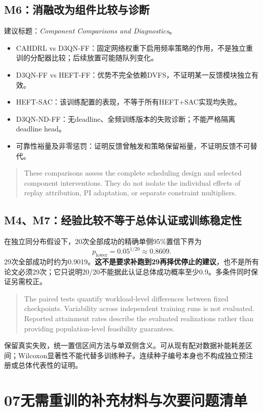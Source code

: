 \documentclass[UTF8,11pt,a4paper,fontset=fandol]{ctexart}
\newenvironment{draft}{\begin{quote}\small\setlength{\parskip}{4pt}}{\end{quote}}
\newcommand{\partpage}[2]{\section*{#1\quad #2}}
\begin{document}
\subsection*{M6：消融改为组件比较与诊断}
建议标题：\textit{Component Comparisons and Diagnostics}。
\begin{itemize}
\item CAHDRL vs D3QN-FF：固定网络权重下启用频率策略的作用，不是独立重训的分配器比较；后续放置可能随队列变化。
\item D3QN-FF vs HEFT-FF：优势不完全依赖DVFS，不证明某一反馈模块独立有效。
\item HEFT-SAC：该训练配置的表现，不等于所有HEFT+SAC实现均失败。
\item D3QN-ND-FF：无deadline、全频训练版本的失败诊断；不能严格隔离deadline head。
\item 可靠性裕量及非零惩罚：证明反馈曾触发和策略保留裕量，不证明反馈不可替代。
\end{itemize}
\begin{draft}
These comparisons assess the complete scheduling design and selected component interventions. They do not isolate the individual effects of replay attribution, PI adaptation, or separate constraint multipliers.
\end{draft}

\subsection*{M4、M7：经验比较不等于总体认证或训练稳定性}
在独立同分布假设下，20次全部成功的精确单侧95\%置信下界为
\[
p_{\mathrm{lower}}=0.05^{1/20}\approx0.8609.
\]
29次全部成功时约为0.9019。\textbf{这不是要求补跑到29再择优停止的建议}，也不是所有论文必须29次；它只说明20/20不能据此认证总体成功概率至少0.9。多条件同时保证另需校正。

\begin{draft}
The paired tests quantify workload-level differences between fixed checkpoints. Variability across independent training runs is not evaluated. Reported attainment rates describe the evaluated realizations rather than providing population-level feasibility guarantees.
\end{draft}
保留真实失败，统一置信区间方法与单双侧含义。可从现有配对数据补能耗差区间；Wilcoxon显著性不能代替多训练种子。连续种子编号本身也不构成独立预注册或总体代表性的证明。

\newpage
\partpage{07}{无需重训的补充材料与次要问题清单}
\end{document}
